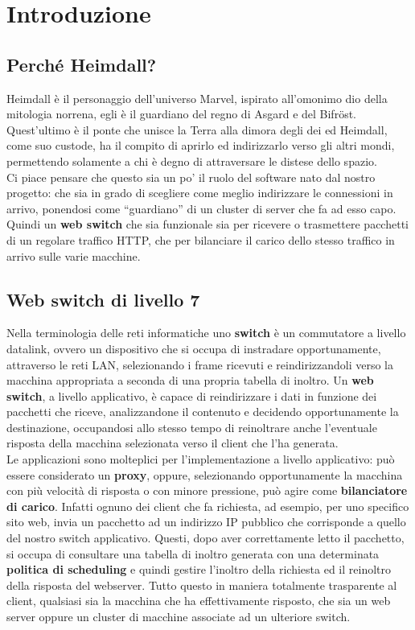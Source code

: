 \documentclass[italian]{tktltiki2}
\begin{document}
\newpage
\section{Introduzione}
\subsection{Perché Heimdall?}
Heimdall è il personaggio dell'universo Marvel, ispirato all'omonimo dio della mitologia norrena, egli è il guardiano del regno di Asgard e del Bifröst. Quest'ultimo è il ponte che unisce la Terra alla dimora degli dei ed Heimdall, come suo custode, ha il compito di aprirlo ed indirizzarlo verso gli altri mondi, permettendo solamente a chi è degno di attraversare le distese dello spazio.
\\
Ci piace pensare che questo sia un po' il ruolo del software nato dal nostro progetto: che sia in grado di scegliere come meglio indirizzare le connessioni in arrivo, ponendosi come ``guardiano'' di un cluster di server che fa ad esso capo. Quindi un \textbf{web switch} che sia funzionale sia per ricevere o trasmettere pacchetti di un regolare traffico HTTP, che per bilanciare il carico dello stesso traffico in arrivo sulle varie macchine.

\subsection{Web switch di livello 7}
Nella terminologia delle reti informatiche uno \textbf{switch} è un commutatore a livello datalink, ovvero un dispositivo che si occupa di instradare opportunamente, attraverso le reti LAN, selezionando i frame ricevuti e reindirizzandoli verso la macchina appropriata a seconda di una propria tabella di inoltro. Un \textbf{web switch}, a livello applicativo, è capace di reindirizzare i dati in funzione dei pacchetti che riceve, analizzandone il contenuto e decidendo opportunamente la destinazione, occupandosi allo stesso tempo di reinoltrare anche l'eventuale risposta della macchina selezionata verso il client che l'ha generata.
\\
Le applicazioni sono molteplici per l'implementazione a livello applicativo: può essere considerato un \textbf{proxy}, oppure, selezionando opportunamente la macchina con più velocità di risposta o con minore pressione, può agire come \textbf{bilanciatore di carico}. Infatti ognuno dei client che fa richiesta, ad esempio, per uno specifico sito web, invia un pacchetto ad un indirizzo IP pubblico che corrisponde a quello del nostro switch applicativo. Questi, dopo aver correttamente letto il pacchetto, si occupa di consultare una tabella di inoltro generata con una determinata \textbf{politica di scheduling} e quindi gestire l'inoltro della richiesta ed il reinoltro della risposta del webserver. Tutto questo in maniera totalmente trasparente al client, qualsiasi sia la macchina che ha effettivamente risposto, che sia un web server oppure un cluster di macchine associate ad un ulteriore switch.
\end{document}
